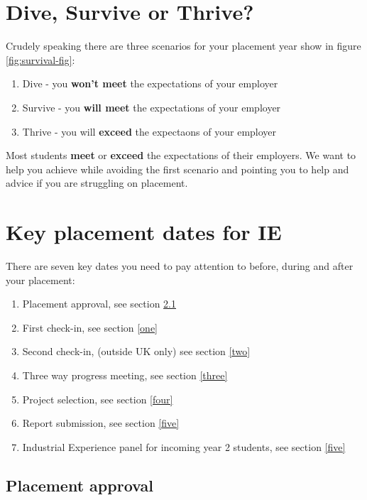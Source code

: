 \documentclass[
]{book}
\providecommand{\tightlist}{%
  \setlength{\itemsep}{0pt}\setlength{\parskip}{0pt}}
\begin{document}
\section{Dive, Survive or Thrive?}\label{thrive}

Crudely speaking there are three scenarios for your placement year show in figure \ref{fig:survival-fig}:

\begin{enumerate}
\def\labelenumi{\arabic{enumi}.}
\tightlist
\item
  Dive - you \textbf{won't meet} the expectations of your employer
\item
  Survive - you \textbf{will meet} the expectations of your employer
\item
  Thrive - you will \textbf{exceed} the expectaons of your employer
\end{enumerate}

Most students \textbf{meet} or \textbf{exceed} the expectations of their employers. We want to help you achieve while avoiding the first scenario and pointing you to help and advice if you are struggling on placement.

\section{Key placement dates for IE}\label{keydates}

There are seven key dates you need to pay attention to before, during and after your placement:

\begin{enumerate}
\def\labelenumi{\arabic{enumi}.}
\tightlist
\item
  Placement approval, see section \ref{approval}
\item
  First check-in, see section \ref{one}
\item
  Second check-in, (outside UK only) see section \ref{two}
\item
  Three way progress meeting, see section \ref{three}
\item
  Project selection, see section \ref{four}
\item
  Report submission, see section \ref{five}
\item
  Industrial Experience panel for incoming year 2 students, see section \ref{five}
\end{enumerate}

\subsection{Placement approval}\label{approval}
\end{document}
